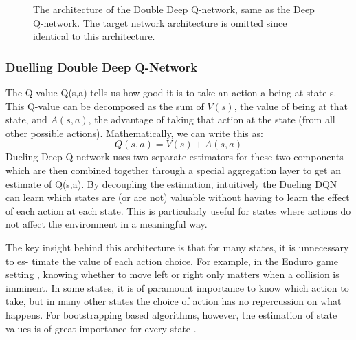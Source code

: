 \documentclass[14pt]{extarticle}
\def\sp{\vspace{5pt}}
\begin{document}
\begin{flushleft}
\begin{figure}[H]
\begin{center}
	    		\caption{The architecture of the Double Deep Q-network, same as the Deep Q-network. The target network architecture is omitted since identical to this architecture.}
\end{center}
\end{figure}

	\subsubsection{Duelling Double Deep Q-Network}
	\sp
	The Q-value Q(s,a) tells us how good it is to take an action a being at state s. This Q-value can be decomposed as the sum of $V(s)$, the value of being at that state, and $A(s,a)$, the advantage of taking that action at the state (from all other possible actions). Mathematically, we can write this as:
	\[ Q(s,a) = V(s) + A(s,a)\]
Dueling Deep Q-network uses two separate estimators for these two components which are then combined together through a special aggregation layer to get an estimate of Q(s,a). By decoupling the estimation, intuitively the Dueling DQN can learn which states are (or are not) valuable without having to learn the effect of each action at each state. This is particularly useful for states where actions do not affect the environment in a meaningful way. \cite{DDQN2} %
	
The key insight behind this architecture is that for many states, it is unnecessary to es- timate the value of each action choice. For example, in the Enduro game setting \cite{Enduro}, knowing whether to move left or right only matters when a collision is imminent. In some states, it is of paramount importance to know which action to take, but in many other states the choice of action has no repercussion on what happens. For bootstrapping based algorithms, however, the estimation of state values is of great importance for every state \cite{DDDQN1}. 


\end{flushleft}
\end{document}
